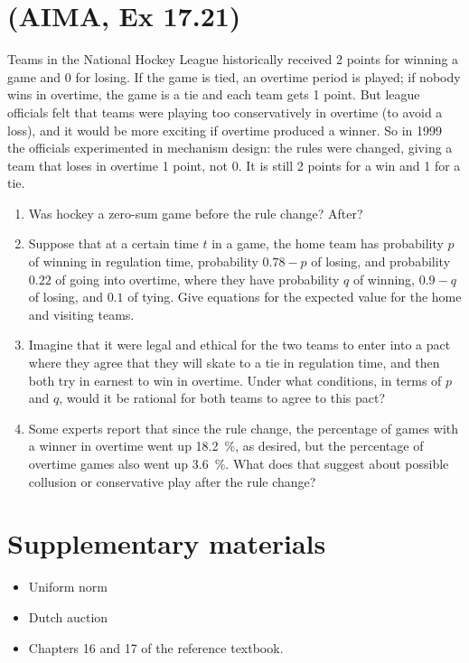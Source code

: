 \documentclass[11pt, a4paper]{article}
\begin{document}
\newpage

\section{(AIMA, Ex 17.21)}

Teams in the National Hockey League historically received 2 points for winning a game and 0 for losing. If the game is tied, an overtime period is played; if nobody wins in overtime, the game is a tie and each team gets 1 point. But league officials felt that teams were playing too conservatively in overtime (to avoid a loss), and it would be more exciting if overtime produced a winner. So in 1999 the officials experimented in mechanism design: the rules were changed, giving a team that loses in overtime 1 point, not 0. It is still 2 points for a win and 1 for a tie.

\begin{enumerate}
    \item Was hockey a zero-sum game before the rule change? After?
    
    \item Suppose that at a certain time $t$ in a game, the home team has probability $p$ of winning in regulation time, probability $0.78 - p$ of losing, and probability $0.22$ of going into overtime, where they have probability $q$ of winning, $0.9 - q$ of losing, and $0.1$ of tying. Give equations for the expected value for the home and visiting teams.

    \item Imagine that it were legal and ethical for the two teams to enter into a pact where they agree that they will skate to a tie in regulation time, and then both try in earnest to win in overtime. Under what conditions, in terms of $p$ and $q$, would it be rational for both teams to agree to this pact?
    
    \item Some experts report that since the rule change, the percentage of games with a winner in overtime went up \SI{18.2}{\percent}, as desired, but the percentage of overtime games also went up \SI{3.6}{\percent}. What does that suggest about possible collusion or conservative play after the rule change?
\end{enumerate}

\newpage

\section*{Supplementary materials}

\begin{itemize}
    \item Uniform norm
    

    \item Dutch auction
    
    
    \item Chapters 16 and 17 of the reference textbook.
\end{itemize}
\end{document}
